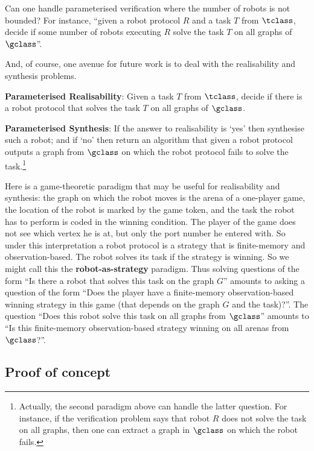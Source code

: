 Can one handle parameterised verification where the number of robots is not
bounded? For instance, ``given a robot protocol $R$ and a task $T$ from
$\tclass$, decide if some number of robots executing $R$ solve the task $T$ on
all graphs of $\gclass$''.


And, of course, one avenue for future work is to deal with the realisability and
synthesis problems.

{\bf Parameterised Realisability}: Given a task $T$ from $\tclass$, decide if
there is a robot protocol that solves the task $T$ on all graphs of $\gclass$.

{\bf Parameterised Synthesis}: If the answer to realisability is `yes' then
synthesise such a robot; and if `no' then return an algorithm that given a robot
protocol outputs a graph from $\gclass$ on which the robot protocol fails to
solve the task.\footnote{Actually, the second paradigm above can handle the
latter question. For instance, if the verification problem says that robot $R$
does not solve the task on all graphs, then one can extract a graph in $\gclass$
on which the robot fails.}

Here is a game-theoretic paradigm that may be useful for realisability and
synthesis: the graph on which the robot moves is the arena of a one-player game,
the location of the robot is marked by the game token, and the task the robot
has to perform is coded in the winning condition. The player of the game does
not see which vertex he is at, but only the port number he entered with. So
under this interpretation a robot protocol is a strategy that is finite-memory
and observation-based. The robot solves its task if the strategy is winning. So
we might call this the {\bf robot-as-strategy} paradigm. Thus solving questions
of the form ``Is there a robot that solves this task on the graph $G$'' amounts
to asking a question of the form ``Does the player have a finite-memory
observation-based winning strategy in this game (that depends on the graph $G$
and the task)?''. The question ``Does this robot solve this task on all graphs
from $\gclass$'' amounts to ``Is this finite-memory observation-based strategy
winning on all arenas from $\gclass$?''.






\subsection{Proof of concept} \label{concept}

